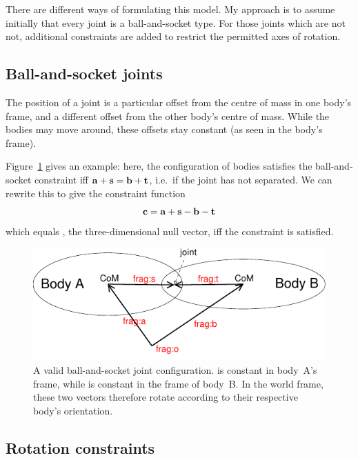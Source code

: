 There are different ways of formulating this model. My approach is to assume initially that every
joint is a ball-and-socket type. For those joints which are not not, additional constraints are
added to restrict the permitted axes of rotation.

\subsection{Ball-and-socket joints}

The position of a joint is a particular offset from the centre of mass in one body's frame, and a
different offset from the other body's centre of mass. While the bodies may move around, these
offsets stay constant (as seen in the body's frame).

Figure~\ref{ballAndSocketFigure} gives an example: here, the configuration of bodies satisfies the
ball-and-socket constraint iff $\ve{a}+\ve{s} = \ve{b}+\ve{t}$, i.e.\ if the joint has not
separated. We can rewrite this to give the constraint function
\begin{equation}
\ve{c} = \ve{a} + \ve{s} - \ve{b} - \ve{t}
\end{equation}
which equals , the three-dimensional null vector, iff the constraint is satisfied.

\begin{figure}
\centerline{\includegraphics{figures/joint2}}
\caption[]{A valid ball-and-socket joint configuration.  is constant in body~A's frame,
    while  is constant in the frame of body~B. In the world frame, these two vectors
    therefore rotate according to their respective body's orientation.\label{ballAndSocketFigure}}
\end{figure}

\subsection{Rotation constraints\label{rotationConstraints}}

